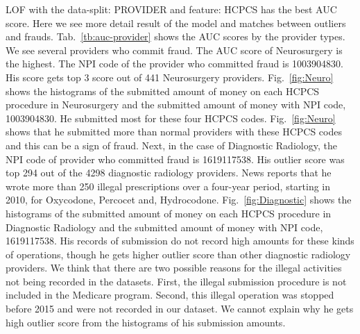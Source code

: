 \documentclass[dvipdfmx, english]{ampmt}             %
\newcommand{\Tabref}[1]{Tab.~\ref{#1}}
\newcommand{\Figref}[1]{Fig.~\ref{#1}}
\begin{document}
LOF with the data-split: PROVIDER and feature: HCPCS has the best AUC score. Here we see more detail result of the model and matches between outliers and frauds.
\Tabref{tb:auc-provider} shows the AUC scores by the provider types. We see several providers who commit fraud. The AUC score of Neurosurgery is the highest. 
The NPI code of the provider who committed fraud is 1003904830. His score gets top 3 score out of 441 Neurosurgery providers. \Figref{fig:Neuro} shows the histograms of the submitted amount of 
money on each HCPCS procedure in Neurosurgery and the submitted amount of money with NPI code, 1003904830. He submitted most for these four HCPCS codes.
\Figref{fig:Neuro} shows that he submitted more than normal providers with these HCPCS codes and this can be a sign of fraud. 
Next, in the case of Diagnostic Radiology, the NPI code of provider who committed fraud is 1619117538. His outlier score was top 294 out of the 4298 diagnostic radiology providers.
News reports that he wrote more than 250 illegal prescriptions over a four-year period, starting in 2010, for Oxycodone, Percocet and, Hydrocodone\cite{Diagnostic}. 
\Figref{fig:Diagnostic} shows the histograms of the submitted amount of money on each HCPCS procedure in Diagnostic Radiology and the submitted amount of money with NPI code, 1619117538.
His records of submission do not record high amounts for these kinds of operations, though he gets higher outlier score than other diagnostic radiology providers. We think that there are two possible reasons for the illegal activities not being recorded in the datasets.
First, the illegal submission procedure is not included in the Medicare program. Second, this illegal operation was stopped before 2015 and were not recorded in our dataset. We cannot explain why he gets high outlier score from the histograms of his submission amounts.
\par




\end{document}
